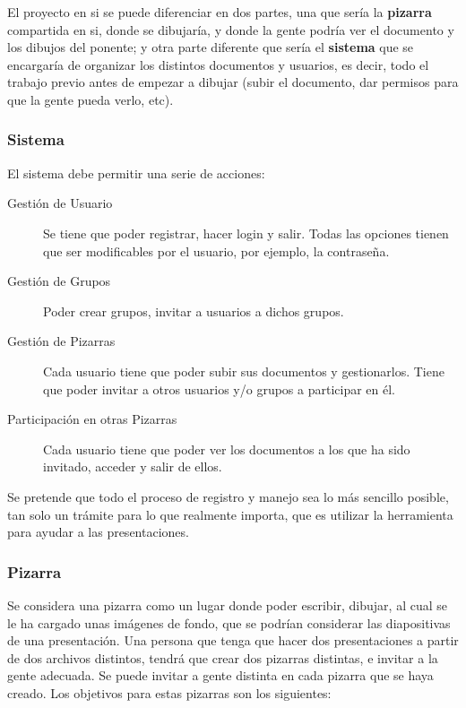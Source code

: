 \documentclass [11pt]{article}
\begin{document}
El proyecto en si se puede diferenciar en dos partes, una que sería la \textbf{pizarra} compartida en si, donde se dibujaría, y donde la gente podría ver el documento y los dibujos del ponente; y otra parte diferente que sería el \textbf{sistema} que se encargaría de organizar los distintos documentos y usuarios, es decir, todo el trabajo previo antes de empezar a dibujar (subir el documento, dar permisos para que la gente pueda verlo, etc).

\subsubsection{Sistema}
El sistema debe permitir una serie de acciones:

\begin{description}
	\item[Gestión de Usuario] Se tiene que poder registrar, hacer login y salir. Todas las opciones tienen que ser modificables por el usuario, por ejemplo, la contraseña.
	\item[Gestión de Grupos] Poder crear grupos, invitar a usuarios a dichos grupos.
	\item[Gestión de Pizarras] Cada usuario tiene que poder subir sus documentos y gestionarlos. Tiene que poder invitar a otros usuarios y/o grupos a participar en él.
	\item[Participación en otras Pizarras] Cada usuario tiene que poder ver los documentos a los que ha sido invitado, acceder y salir de ellos.
\end{description}

Se pretende que todo el proceso de registro y manejo sea lo más sencillo posible, tan solo un trámite para lo que realmente importa, que es utilizar la herramienta para ayudar a las presentaciones.

\subsubsection{Pizarra}
Se considera una pizarra como un lugar donde poder escribir, dibujar, al cual se le ha cargado unas imágenes de fondo, que se podrían considerar las diapositivas de una presentación. Una persona que tenga que hacer dos presentaciones a partir de dos archivos distintos, tendrá que crear dos pizarras distintas, e invitar a la gente adecuada. Se puede invitar a gente distinta en cada pizarra que se haya creado. Los objetivos para estas pizarras son los siguientes:
\end{document}
